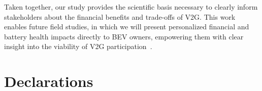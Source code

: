 \documentclass[pdflatex,sn-nature]{sn-jnl}%
\theoremstyle{thmstyleone}%
\theoremstyle{thmstyletwo}%
\theoremstyle{thmstylethree}%
\begin{document}
Taken together, our study provides the scientific basis necessary to clearly inform stakeholders about the financial benefits and trade-offs of V2G. This work enables future field studies, in which we will present personalized financial and battery health impacts directly to BEV owners, empowering them with clear insight into the viability of V2G participation~\cite{clement_autoui}.

\backmatter




% 


\section*{Declarations}

\end{document}
